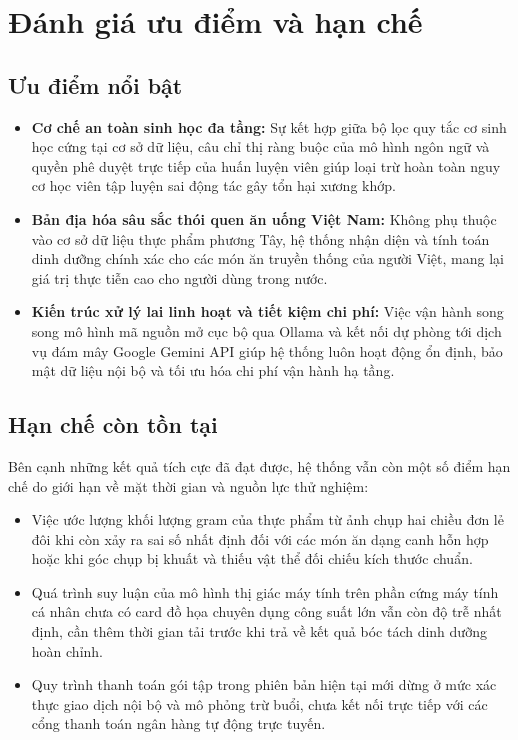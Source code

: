 \section{Đánh giá ưu điểm và hạn chế}
\label{sec:uunhuocdiem}

\subsection{Ưu điểm nổi bật}
\label{subsec:uudiem}

\begin{itemize}[leftmargin=1.5cm]
    \item \textbf{Cơ chế an toàn sinh học đa tầng:} Sự kết hợp giữa bộ lọc quy tắc cơ sinh học cứng tại cơ sở dữ liệu, câu chỉ thị ràng buộc của mô hình ngôn ngữ và quyền phê duyệt trực tiếp của huấn luyện viên giúp loại trừ hoàn toàn nguy cơ học viên tập luyện sai động tác gây tổn hại xương khớp.
    \item \textbf{Bản địa hóa sâu sắc thói quen ăn uống Việt Nam:} Không phụ thuộc vào cơ sở dữ liệu thực phẩm phương Tây, hệ thống nhận diện và tính toán dinh dưỡng chính xác cho các món ăn truyền thống của người Việt, mang lại giá trị thực tiễn cao cho người dùng trong nước.
    \item \textbf{Kiến trúc xử lý lai linh hoạt và tiết kiệm chi phí:} Việc vận hành song song mô hình mã nguồn mở cục bộ qua Ollama và kết nối dự phòng tới dịch vụ đám mây Google Gemini API giúp hệ thống luôn hoạt động ổn định, bảo mật dữ liệu nội bộ và tối ưu hóa chi phí vận hành hạ tầng.
\end{itemize}

\subsection{Hạn chế còn tồn tại}
\label{subsec:hanche}

Bên cạnh những kết quả tích cực đã đạt được, hệ thống vẫn còn một số điểm hạn chế do giới hạn về mặt thời gian và nguồn lực thử nghiệm:
\begin{itemize}[leftmargin=1.5cm]
    \item Việc ước lượng khối lượng gram của thực phẩm từ ảnh chụp hai chiều đơn lẻ đôi khi còn xảy ra sai số nhất định đối với các món ăn dạng canh hỗn hợp hoặc khi góc chụp bị khuất và thiếu vật thể đối chiếu kích thước chuẩn.
    \item Quá trình suy luận của mô hình thị giác máy tính trên phần cứng máy tính cá nhân chưa có card đồ họa chuyên dụng công suất lớn vẫn còn độ trễ nhất định, cần thêm thời gian tải trước khi trả về kết quả bóc tách dinh dưỡng hoàn chỉnh.
    \item Quy trình thanh toán gói tập trong phiên bản hiện tại mới dừng ở mức xác thực giao dịch nội bộ và mô phỏng trừ buổi, chưa kết nối trực tiếp với các cổng thanh toán ngân hàng tự động trực tuyến.
\end{itemize}

